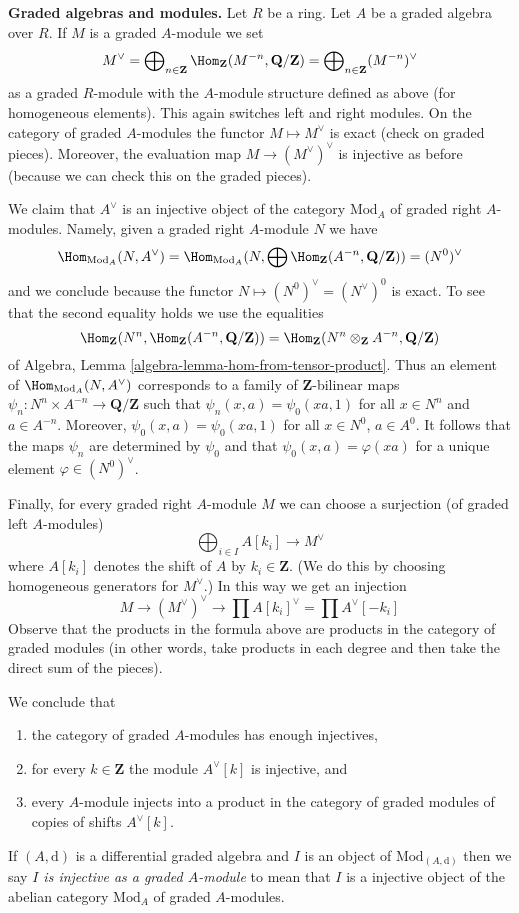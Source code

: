 \noindent
{\bf Graded algebras and modules.}
Let $R$ be a ring. Let $A$ be a graded algebra over $R$.
If $M$ is a graded $A$-module we set
$$
M^\vee =
\bigoplus\nolimits_{n \in \mathbf{Z}}
\Hom_\mathbf{Z}(M^{-n}, \mathbf{Q}/\mathbf{Z}) =
\bigoplus\nolimits_{n \in \mathbf{Z}} (M^{-n})^\vee
$$
as a graded $R$-module with the $A$-module structure defined as above
(for homogeneous elements). This again switches left and right modules.
On the category of graded $A$-modules the functor $M \mapsto M^\vee$
is exact (check on graded pieces). Moreover, the evaluation map
$M \to (M^\vee)^\vee$ is injective as before (because we can check
this on the graded pieces).

\medskip\noindent
We claim that $A^\vee$ is an injective object of the category
$\text{Mod}_A$ of graded right $A$-modules. Namely, given a graded
right $A$-module $N$ we have
$$
\Hom_{\text{Mod}_A}(N, A^\vee) =
\Hom_{\text{Mod}_A}(
N, \bigoplus \Hom_\mathbf{Z}(A^{-n}, \mathbf{Q}/\mathbf{Z})) = (N^0)^\vee
$$
and we conclude because the functor $N \mapsto (N^0)^\vee = (N^\vee)^0$
is exact. To see that the second equality holds we use the equalities
$$
\Hom_\mathbf{Z}(N^n, \Hom_\mathbf{Z}(A^{-n}, \mathbf{Q}/\mathbf{Z})) =
\Hom_\mathbf{Z}(N^n \otimes_\mathbf{Z} A^{-n}, \mathbf{Q}/\mathbf{Z})
$$
of Algebra, Lemma \ref{algebra-lemma-hom-from-tensor-product}.
Thus an element of $\Hom_{\text{Mod}_A}(N, A^\vee)$ corresponds
to a family of $\mathbf{Z}$-bilinear maps
$\psi_n : N^n \times A^{-n} \to \mathbf{Q}/\mathbf{Z}$ such that
$\psi_n(x, a) = \psi_0(xa, 1)$ for all $x \in N^n$ and $a \in A^{-n}$.
Moreover, $\psi_0(x, a) = \psi_0(xa, 1)$ for all $x \in N^0$, $a \in A^0$.
It follows that the maps $\psi_n$ are determined by $\psi_0$ and that
$\psi_0(x, a) = \varphi(xa)$ for a unique element $\varphi \in (N^0)^\vee$.

\medskip\noindent
Finally, for every graded right $A$-module $M$ we can choose a surjection
(of graded left $A$-modules)
$$
\bigoplus\nolimits_{i \in I} A[k_i] \to M^\vee
$$
where $A[k_i]$ denotes the shift of $A$ by $k_i \in \mathbf{Z}$.
(We do this by choosing homogeneous generators for $M^\vee$.)
In this way we get an injection
$$
M \to (M^\vee)^\vee \to \prod A[k_i]^\vee = \prod A^\vee[-k_i]
$$
Observe that the products in the formula above are products in the
category of graded modules (in other words, take products in each degree
and then take the direct sum of the pieces).

\medskip\noindent
We conclude that
\begin{enumerate}
\item the category of graded $A$-modules has enough injectives,
\item for every $k \in \mathbf{Z}$ the module $A^\vee[k]$ is injective, and
\item every $A$-module injects into a product in the category of graded
modules of copies of shifts $A^\vee[k]$.
\end{enumerate}
If $(A, \text{d})$ is a differential graded algebra and $I$ is
an object of $\text{Mod}_{(A, \text{d})}$ then we say
{\it $I$ is injective as a graded $A$-module} to mean
that $I$ is a injective object of the abelian category $\text{Mod}_A$
of graded $A$-modules.

